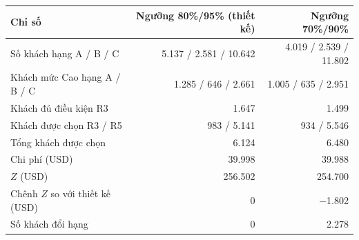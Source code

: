 \begin{tabular}{lrr}
\toprule
Chỉ số & Ngưỡng 80\%/95\% (thiết kế) & Ngưỡng 70\%/90\% \\
\midrule
Số khách hạng A / B / C & 5.137 / 2.581 / 10.642 & 4.019 / 2.539 / 11.802 \\
Khách mức Cao hạng A / B / C & 1.285 / 646 / 2.661 & 1.005 / 635 / 2.951 \\
Khách đủ điều kiện R3 & 1.647 & 1.499 \\
Khách được chọn R3 / R5 & 983 / 5.141 & 934 / 5.546 \\
Tổng khách được chọn & 6.124 & 6.480 \\
Chi phí (USD) & 39.998 & 39.988 \\
$Z$ (USD) & 256.502 & 254.700 \\
Chênh $Z$ so với thiết kế (USD) & 0 & $-$1.802 \\
Số khách đổi hạng & 0 & 2.278 \\
\bottomrule
\end{tabular}
